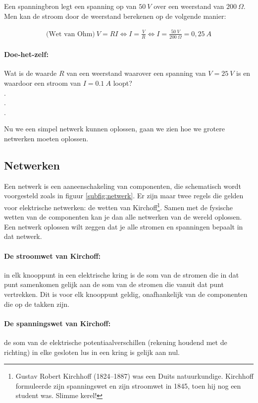 \documentclass{article}
\begin{document}
Een spanningbron legt een spanning op van $50~V$ over een weerstand van $200~\Omega$. Men kan de stroom door de weerstand berekenen op de volgende manier:

\begin{align}
	\text{(Wet van Ohm)}~V = RI \Leftrightarrow I = \frac{V}{R} \Leftrightarrow I = \frac{50~V}{200~\Omega}= 0,25~A
\end{align}

\paragraph*{Doe-het-zelf:} Wat is de waarde $R$ van een weerstand waarover een spanning van $V = 25~V$ is en waardoor een stroom van $I = 0.1~A$ loopt?
\\.\dotfill \\.\dotfill \\.\dotfill 

Nu we een simpel netwerk kunnen oplossen, gaan we zien hoe we grotere netwerken moeten oplossen.
\subsection{Netwerken}
Een netwerk is een aaneenschakeling van componenten, die schematisch wordt voorgesteld zoals in figuur \ref{subfig:netwerk}. Er zijn maar twee regels die gelden voor elektrische netwerken: de wetten van Kirchoff\footnote{Gustav Robert Kirchhoff (1824–1887) was een Duits natuurkundige. Kirchhoff formuleerde zijn spanningswet en zijn stroomwet in 1845, toen hij nog een student was. Slimme kerel!}. Samen met de fysische wetten van de componenten kan je dan alle netwerken van de wereld oplossen. Een netwerk oplossen wilt zeggen dat je alle stromen en spanningen bepaalt in dat netwerk.

\paragraph*{De stroomwet van Kirchoff:} in elk knooppunt in een elektrische kring is de som van de stromen die in dat punt samenkomen gelijk aan de som van de stromen die vanuit dat punt vertrekken. Dit is voor elk knooppunt geldig, onafhankelijk van de componenten die op de takken zijn. 
\paragraph*{De spanningswet van Kirchoff:} de som van de elektrische potentiaalverschillen (rekening houdend met de richting) in elke gesloten lus in een kring is gelijk aan nul. 
\end{document}

